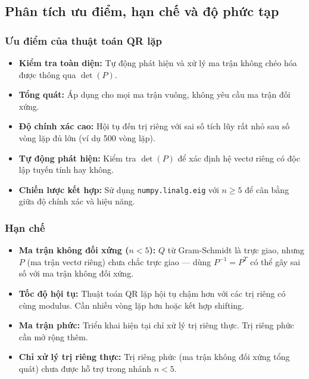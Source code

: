 \documentclass[a4paper,12pt]{report}
\begin{document}
\subsection{Phân tích ưu điểm, hạn chế và độ phức tạp}
\subsubsection{Ưu điểm của thuật toán QR lặp}
\begin{itemize}
  \item \textbf{Kiểm tra toàn diện:} Tự động phát hiện và xử lý ma trận không chéo hóa được thông qua $\det(P)$.
  
  \item \textbf{Tổng quát:} Áp dụng cho mọi ma trận vuông, không yêu cầu ma trận đối xứng.
  
  \item \textbf{Độ chính xác cao:} Hội tụ đến trị riêng với sai số tích lũy rất nhỏ sau số vòng lặp đủ lớn (ví dụ 500 vòng lặp).
  
  \item \textbf{Tự động phát hiện:} Kiểm tra $\det(P)$ để xác định hệ vectơ riêng có độc lập tuyến tính hay không.
  
  \item \textbf{Chiến lược kết hợp:} Sử dụng \texttt{numpy.linalg.eig} với $n \ge 5$ để cân bằng giữa độ chính xác và hiệu năng.
\end{itemize}

\subsubsection{Hạn chế}
\begin{itemize}
  \item \textbf{Ma trận không đối xứng ($n < 5$):} $Q$ từ Gram-Schmidt là trực giao, nhưng $P$ (ma trận vectơ riêng) chưa chắc trực giao --- dùng $P^{-1} = P^T$ có thể gây sai số với ma trận không đối xứng.
  
  \item \textbf{Tốc độ hội tụ:} Thuật toán QR lặp hội tụ chậm hơn với các trị riêng có cùng modulus. Cần nhiều vòng lặp hơn hoặc kết hợp shifting.
  
  \item \textbf{Ma trận phức:} Triển khai hiện tại chỉ xử lý trị riêng thực. Trị riêng phức cần mở rộng thêm.
  
  \item \textbf{Chỉ xử lý trị riêng thực:} Trị riêng phức (ma trận không đối xứng tổng quát) chưa được hỗ trợ trong nhánh $n < 5$.
\end{itemize}
\end{document}
